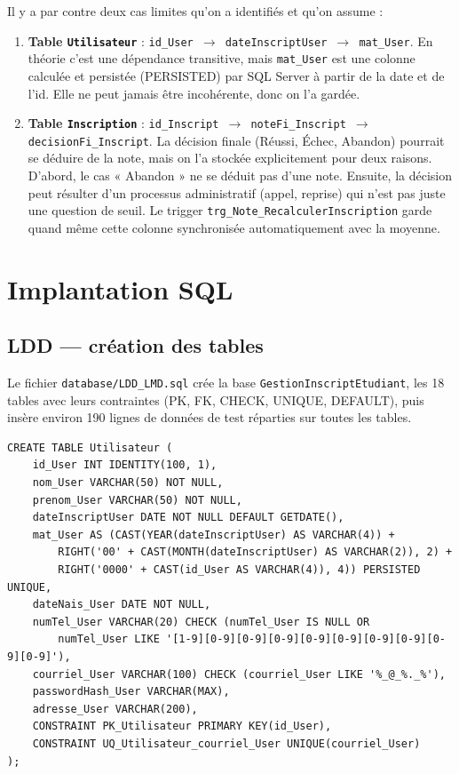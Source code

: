 \documentclass[11pt,a4paper]{article}
\begin{document}
Il y a par contre deux cas limites qu'on a identifiés et qu'on assume :

\begin{enumerate}
    \item \textbf{Table \texttt{Utilisateur}} :
        \texttt{id\_User $\to$ dateInscriptUser $\to$ mat\_User}. En
        théorie c'est une dépendance transitive, mais \texttt{mat\_User}
        est une colonne calculée et persistée (PERSISTED) par SQL
        Server à partir de la date et de l'id. Elle ne peut jamais être
        incohérente, donc on l'a gardée.

    \item \textbf{Table \texttt{Inscription}} :
        \texttt{id\_Inscript $\to$ noteFi\_Inscript $\to$ decisionFi\_Inscript}.
        La décision finale (Réussi, Échec, Abandon) pourrait se déduire
        de la note, mais on l'a stockée explicitement pour deux raisons.
        D'abord, le cas « Abandon » ne se déduit pas d'une note. Ensuite,
        la décision peut résulter d'un processus administratif (appel,
        reprise) qui n'est pas juste une question de seuil. Le trigger
        \texttt{trg\_Note\_RecalculerInscription} garde quand même
        cette colonne synchronisée automatiquement avec la moyenne.
\end{enumerate}


\section{Implantation SQL}

\subsection{LDD --- création des tables}

Le fichier \texttt{database/LDD\_LMD.sql} crée la base
\texttt{GestionInscriptEtudiant}, les 18 tables avec leurs contraintes
(PK, FK, CHECK, UNIQUE, DEFAULT), puis insère environ 190 lignes de
données de test réparties sur toutes les tables.

\begin{lstlisting}[caption={Extrait de \texttt{LDD\_LMD.sql} --- table Utilisateur}]
CREATE TABLE Utilisateur (
    id_User INT IDENTITY(100, 1),
    nom_User VARCHAR(50) NOT NULL,
    prenom_User VARCHAR(50) NOT NULL,
    dateInscriptUser DATE NOT NULL DEFAULT GETDATE(),
    mat_User AS (CAST(YEAR(dateInscriptUser) AS VARCHAR(4)) +
        RIGHT('00' + CAST(MONTH(dateInscriptUser) AS VARCHAR(2)), 2) +
        RIGHT('0000' + CAST(id_User AS VARCHAR(4)), 4)) PERSISTED UNIQUE,
    dateNais_User DATE NOT NULL,
    numTel_User VARCHAR(20) CHECK (numTel_User IS NULL OR
        numTel_User LIKE '[1-9][0-9][0-9][0-9][0-9][0-9][0-9][0-9][0-9][0-9]'),
    courriel_User VARCHAR(100) CHECK (courriel_User LIKE '%_@_%._%'),
    passwordHash_User VARCHAR(MAX),
    adresse_User VARCHAR(200),
    CONSTRAINT PK_Utilisateur PRIMARY KEY(id_User),
    CONSTRAINT UQ_Utilisateur_courriel_User UNIQUE(courriel_User)
);
\end{lstlisting}
\end{document}

